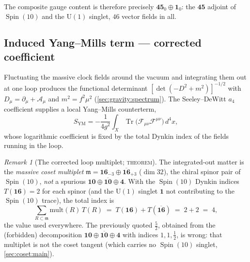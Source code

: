 \documentclass[11pt]{article}
\theoremstyle{plain}
\theoremstyle{definition}
\theoremstyle{remark}
\newtheorem{remark}[theorem]{Remark}
\newcommand{\U}[1]{\mathrm{U}(#1)}
\newcommand{\Spin}{\operatorname{Spin}}
\newcommand{\Tr}{\operatorname{Tr}}
\newcommand{\Uone}{\U{1}}
\begin{document}
The composite gauge content is therefore precisely $\mathbf{45}_{0}\oplus\mathbf 1_{0}$:
the $\mathbf{45}$ adjoint of $\Spin(10)$ and the $\Uone$ singlet,
$46$ vector fields in all.

\subsection{Induced Yang--Mills term --- corrected coefficient}
\label{sec:gauge:YM}

Fluctuating the massive clock fields around the vacuum and integrating
them out at one loop produces the functional determinant
$[\det(-D^{2}+m^{2})]^{-1/2}$ with $D_\mu=\partial_\mu+\mathcal A_\mu$ and
$m^{2}=f^{2}\mu^{2}$ (\autoref{sec:gravity:spectrum}). The Seeley--DeWitt
$a_4$ coefficient supplies a local Yang--Mills counterterm,
\begin{equation}\label{eq:gauge:YM}
  S_{\text{YM}}
  = -\frac{1}{4g^{2}}\int_{X}\Tr\!\bigl(\mathcal F_{\mu\nu}\mathcal F^{\mu\nu}\bigr)\,d^{4}x,
\end{equation}
whose logarithmic coefficient is fixed by the total Dynkin index of the
fields running in the loop.

\begin{remark}[The corrected loop multiplet; \textsc{theorem}]
\label{rem:gauge:correctedindex}
The integrated-out matter is the \emph{massive coset multiplet}
$\mathfrak m=\mathbf{16}_{-3}\oplus\overline{\mathbf{16}}_{+3}$
($\dim 32$), the chiral spinor pair of $\Spin(10)$, \emph{not} a
spurious $\mathbf{10}\oplus\overline{\mathbf{10}}\oplus\mathbf 4$.
With the $\Spin(10)$ Dynkin indices $T(\mathbf{16})=2$ for each spinor
(and the $\Uone$ singlet $\mathbf 1$ not contributing to the
$\Spin(10)$ trace), the total index is
\begin{equation}\label{eq:gauge:totalindex}
  \sum_{R\subset\mathfrak m}\mathrm{mult}(R)\,T(R)
  \;=\; T(\mathbf{16})+T(\overline{\mathbf{16}})
  \;=\; 2+2 \;=\; 4,
\end{equation}
the value used everywhere. The previously quoted $\tfrac52$, obtained
from the (forbidden) decomposition $\mathbf{10}\oplus\overline{\mathbf{10}}\oplus\mathbf 4$
with indices $1,1,\tfrac12$, is wrong: that multiplet is not the coset
tangent (which carries no $\Spin(10)$ singlet, \autoref{sec:coset:main}).
\end{remark}
\end{document}
